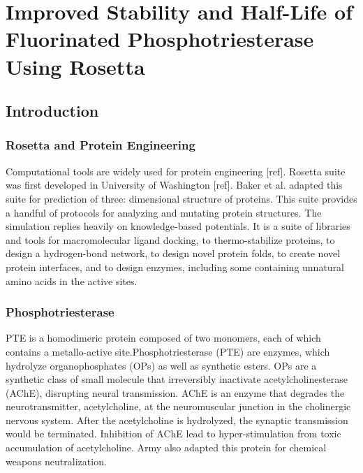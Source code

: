 \chapter{Improved Stability and Half-Life of Fluorinated Phosphotriesterase
Using Rosetta} 
\label{chap:rosetta}
\usepackage[version=3]{mhchem} %
\usepackage{gensymb} %
\usepackage{textcomp}

\begin{refsection}

\section{Introduction}

\subsection{Rosetta and Protein Engineering}
\label{sec:rosetta}

Computational tools are widely used for protein engineering [ref]. Rosetta
suite was first developed in University of Washington [ref]. Baker et al.
adapted this suite for prediction of three: dimensional structure of proteins.
This suite provides a handful of protocols for analyzing and mutating protein
structures. The simulation replies heavily on knowledge-based potentials. It is
a suite of libraries and tools for macromolecular ligand docking, to
thermo-stabilize proteins, to design a hydrogen-bond network, to design novel
protein folds, to create novel protein interfaces, and to design enzymes,
including some containing unnatural amino acids in the active sites.

\subsection{Phosphotriesterase} 
\label{sec:pte}

PTE is a homodimeric protein composed of two monomers, each of which contains a
metallo-active site.Phosphotriesterase (PTE) are enzymes, which hydrolyze
organophosphates (OPs) as well as synthetic esters.\cite{Ghanem2005a} OPs are a
synthetic class of small molecule that irreversibly inactivate
acetylcholinesterase (AChE), disrupting neural transmission. AChE is an enzyme
that degrades the neurotransmitter, acetylcholine, at the neuromuscular
junction in the cholinergic nervous system. After the acetylcholine is
hydrolyzed, the synaptic transmission would be terminated. Inhibition of AChE
lead to hyper-stimulation from toxic accumulation of
acetylcholine.\cite{Soreq2001} Army also adapted this protein for chemical
weapons neutralization. \cite{Yang2014a}


\end{refsection}
